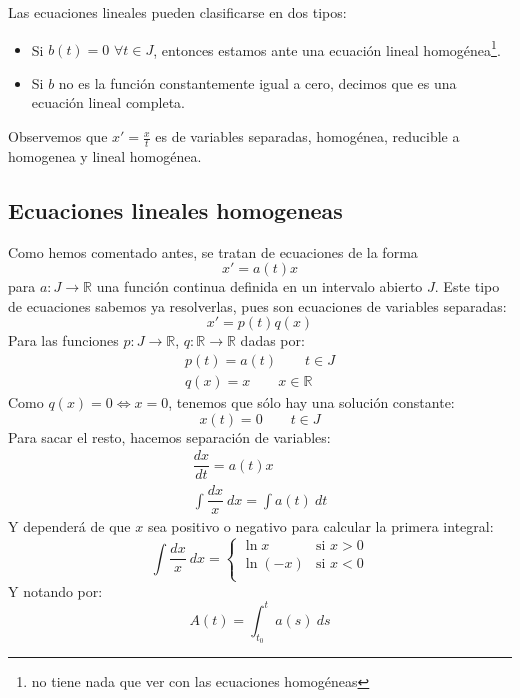 Las ecuaciones lineales pueden clasificarse en dos tipos:
\begin{itemize}
    \item Si $b(t)=0$ $\forall t\in J$, entonces estamos ante una ecuación lineal homogénea\footnote{no tiene nada que ver con las ecuaciones homogéneas}.
    \item Si $b$ no es la función constantemente igual a cero, decimos que es una ecuación lineal completa.
\end{itemize}

\begin{observacion}
Observemos que $x' = \frac{x}{t}$ es de variables separadas, homogénea, reducible a homogenea y lineal homogénea.
\end{observacion}

\subsection{Ecuaciones lineales homogeneas}
Como hemos comentado antes, se tratan de ecuaciones de la forma
\begin{equation*}
    x' = a(t) x
\end{equation*}
para $a:J\rightarrow\mathbb{R}$ una función continua definida en un intervalo abierto $J$. Este tipo de ecuaciones sabemos ya resolverlas, pues son ecuaciones de variables separadas:
\begin{equation*}
    x' = p(t)q(x)
\end{equation*}
Para las funciones $p:J\rightarrow\mathbb{R}$, $q:\mathbb{R}\rightarrow\mathbb{R}$ dadas por:
\begin{gather*}
    p(t) = a(t) \qquad t\in J \\
    q(x) = x \qquad x\in \mathbb{R}
\end{gather*}
Como $q(x) = 0\Longleftrightarrow x=0$, tenemos que sólo hay una solución constante:
\begin{equation*}
    x(t) = 0 \qquad t \in J
\end{equation*}
Para sacar el resto, hacemos separación de variables:
\begin{gather*}
    \dfrac{dx}{dt} = a(t) x \\
    \int \dfrac{dx}{x}~dx  = \int a(t)~dt
\end{gather*}
Y dependerá de que $x$ sea positivo o negativo para calcular la primera integral:
\begin{equation*}
    \int \dfrac{dx}{x}~dx  = \left\{\begin{array}{cl}
            \ln x & \text{si\ } x > 0 \\
            \ln (-x) & \text{si\ } x < 0 \\
    \end{array}\right.
\end{equation*}
Y notando por:
\begin{equation*}
    A(t) = \int_{t_0}^{t} a(s)~ds 
\end{equation*}

